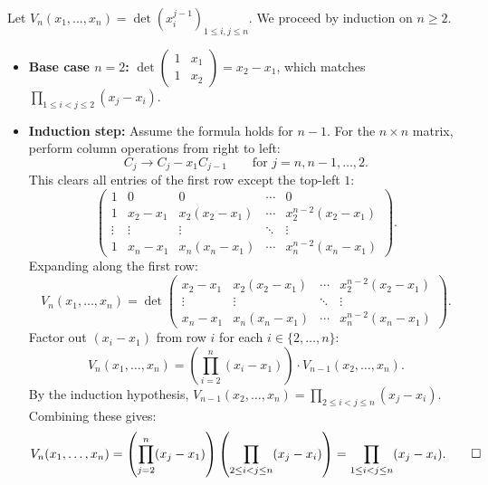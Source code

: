 \begin{exercisesolution}
\label{sol:vandermonde_determinant}
Let $V_n(x_1, \dots, x_n) = \det(x_i^{j-1})_{1 \le i, j \le n}$. We proceed by induction on $n \ge 2$.
\begin{itemize}
    \item \textbf{Base case $n = 2$:}
    $\det \left(\begin{smallmatrix} 1 & x_1 \\ 1 & x_2 \end{smallmatrix}\right) = x_2 - x_1$, which matches $\prod_{1 \le i < j \le 2} (x_j - x_i)$.
    \item \textbf{Induction step:}
    Assume the formula holds for $n-1$. For the $n \times n$ matrix, perform column operations from right to left:
    \[
    C_j \longrightarrow C_j - x_1 C_{j-1} \qquad \text{for } j = n, n-1, \dots, 2.
    \]
    This clears all entries of the first row except the top-left $1$:
    \[
    \begin{pmatrix}
      1 & 0 & 0 & \cdots & 0 \\
      1 & x_2 - x_1 & x_2(x_2 - x_1) & \cdots & x_2^{n-2}(x_2 - x_1) \\
      \vdots & \vdots & \vdots & \ddots & \vdots \\
      1 & x_n - x_1 & x_n(x_n - x_1) & \cdots & x_n^{n-2}(x_n - x_1)
    \end{pmatrix}.
    \]
    Expanding along the first row:
    \[
    V_n(x_1, \dots, x_n) = \det \begin{pmatrix}
      x_2 - x_1 & x_2(x_2 - x_1) & \cdots & x_2^{n-2}(x_2 - x_1) \\
      \vdots & \vdots & \ddots & \vdots \\
      x_n - x_1 & x_n(x_n - x_1) & \cdots & x_n^{n-2}(x_n - x_1)
    \end{pmatrix}.
    \]
    Factor out $(x_i - x_1)$ from row $i$ for each $i \in \{2, \dots, n\}$:
    \[
    V_n(x_1, \dots, x_n) = \left(\prod_{i=2}^n (x_i - x_1)\right) \cdot V_{n-1}(x_2, \dots, x_n).
    \]
    By the induction hypothesis, $V_{n-1}(x_2, \dots, x_n) = \prod_{2 \le i < j \le n} (x_j - x_i)$.
    Combining these gives:
    \[
    V_n(x_1, \dots, x_n) = \left(\prod_{j=2}^n (x_j - x_1)\right) \left(\prod_{2 \le i < j \le n} (x_j - x_i)\right) = \prod_{1 \le i < j \le n} (x_j - x_i). \qedhere
    \]
\end{itemize}
\end{exercisesolution}

